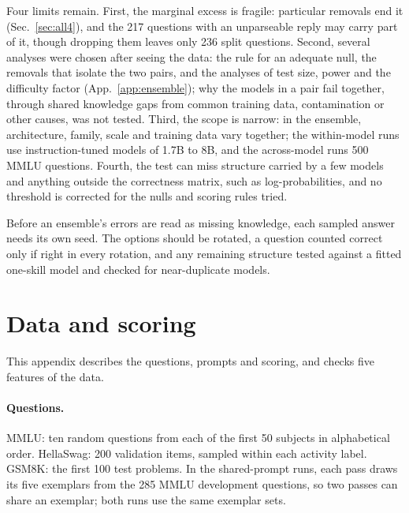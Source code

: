 \documentclass{article}
\theoremstyle{plain}
\theoremstyle{remark}
\begin{document}
Four limits remain. First, the marginal excess is
fragile: particular removals end it (Sec.~\ref{sec:all4}), and the 217
questions with an unparseable reply may carry part of it, though
dropping them leaves only 236 split questions. Second, several analyses were chosen after seeing
the data: the rule for an adequate null, the removals that isolate the
two pairs, and the analyses of test size, power and the difficulty
factor (App.~\ref{app:ensemble}); why the models in a pair fail
together, through shared knowledge gaps from common training data,
contamination or other causes, was not tested. Third, the scope is
narrow: in the ensemble, architecture, family, scale and training data
vary together; the within-model runs use instruction-tuned models of
1.7B to 8B, and the across-model runs 500 MMLU questions. Fourth, the
test can miss structure carried by a few models and anything outside
the correctness matrix, such as log-probabilities, and no threshold is
corrected for the nulls and scoring rules tried.

Before an ensemble's errors are read as missing knowledge, each sampled
answer needs its own seed. The options should be rotated, a question counted
correct only if right in every rotation, and any remaining
structure tested against a fitted one-skill model and checked for
near-duplicate models.

{\footnotesize


}

\appendix
\renewcommand{\thefigure}{A\arabic{figure}}
\renewcommand{\thetable}{A\arabic{table}}
\renewcommand{\theHfigure}{A\arabic{figure}}
\renewcommand{\theHtable}{A\arabic{table}}
\setcounter{figure}{0}
\setcounter{table}{0}


\section{Data and scoring}
\label{app:data}

This appendix describes the questions, prompts and scoring, and checks
five features of the data.

\paragraph{Questions.} MMLU: ten random questions from each of the
first 50 subjects in alphabetical order. HellaSwag: 200 validation
items, sampled within each activity label. GSM8K: the first 100 test
problems. In the shared-prompt runs, each pass draws its five exemplars from the 285 MMLU development
questions, so two passes can share an exemplar; both runs use the same
exemplar sets.
\end{document}
